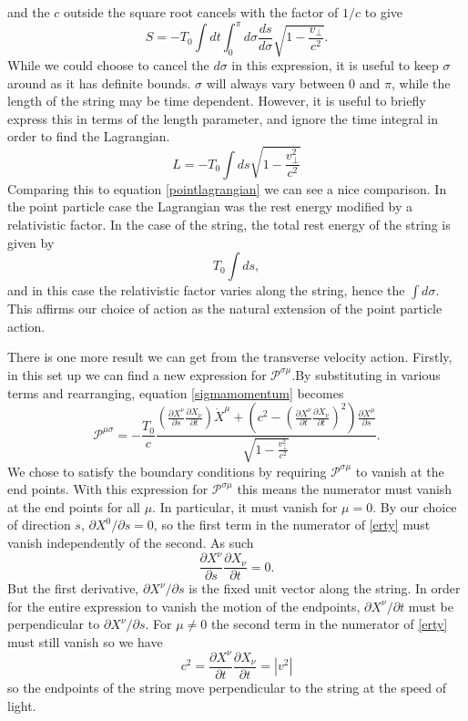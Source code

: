 \documentclass[a4paper,12pt]{article}
\numberwithin{equation}{section}
\begin{document}
and the $c$ outside the square root cancels with the factor of $1/c$ to give
\begin{equation}
S = -T_0\int dt \int_0^\pi d\sigma \frac{ds}{d\sigma}\sqrt{1-\frac{v_\perp}{c^2}}.
\end{equation}
While we could choose to cancel the $d\sigma$ in this expression, it is useful to keep $\sigma$ around as it has definite bounds. $\sigma$ will always vary between 0 and $\pi$, while the length of the string may be time dependent. However, it is useful to briefly express this in terms of the length parameter, and ignore the time integral in order to find the Lagrangian.
\begin{equation}
L = -T_0 \int ds \sqrt{1-\frac{v^2_\perp}{c^2}}
\end{equation}
Comparing this to equation \ref{pointlagrangian} we can see a nice comparison. In the point particle case the Lagrangian was the rest energy modified by a relativistic factor. In the case of the string, the total rest energy of the string is given by  
\begin{equation}
T_0\int ds,
\end{equation}
and in this case the relativistic factor varies along the string, hence the $\int d\sigma$. This affirms our choice of action as the natural extension of the point particle action.

There is one more result we can get from the transverse velocity action. Firstly, in this set up we can find a new expression for $\mathcal{P}^{\sigma\mu}$.By substituting in various terms and rearranging, equation \ref{sigmamomentum} becomes
\begin{equation}\label{erty}
\mathcal{P}^{\mu\sigma} = -\frac{T_0}{c}\frac{\left(\frac{\partial X^\nu}{\partial s}\frac{\partial X_\nu}{\partial t}\right)\dot{X}^\mu + \left(c^2 -\left(\frac{\partial X^\nu}{\partial t}\frac{\partial X_\nu}{\partial t}\right)^2\right)\frac{\partial X^\mu}{\partial s}}{\sqrt{1-\frac{v_\perp^2}{c^2}}}.
\end{equation}
We chose to satisfy the boundary conditions by requiring $\mathcal{P}^{\sigma\mu}$ to vanish at the end points. With this expression for $\mathcal{P}^{\sigma\mu}$ this means the numerator must vanish at the end points for all $\mu$. In particular, it must vanish for $\mu=0$. By our choice of direction $s$, $\partial X^0/\partial s = 0$, so the first term in the numerator of \ref{erty} must vanish independently of the second. As such
\begin{equation}
\frac{\partial X^\nu}{\partial s}\frac{\partial X_\nu}{\partial t} = 0.
\end{equation}
But the first derivative, $\partial X^\nu/\partial s$ is the fixed unit vector along the string. In order for the entire expression to vanish the motion of the endpoints, $\partial X^\nu/\partial t$ must be perpendicular to $\partial X^\nu/\partial s$.
For $\mu \ne 0$ the second term in the numerator of \ref{erty} must still vanish so we have
\begin{equation}
c^2 = \frac{\partial X^\nu}{\partial t}\frac{\partial X_\nu}{\partial t} = |v^2|
\end{equation}
so the endpoints of the string move perpendicular to the string at the speed of light.
\end{document}
